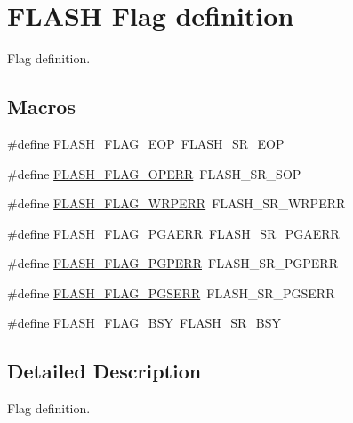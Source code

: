 \hypertarget{group___f_l_a_s_h___flag__definition}{}\section{F\+L\+A\+SH Flag definition}
\label{group___f_l_a_s_h___flag__definition}


Flag definition.  


\subsection*{Macros}
\begin{DoxyCompactItemize}
\item 
\#define \hyperlink{group___f_l_a_s_h___flag__definition_gaf043ba4d8f837350bfc7754a99fae5a9}{F\+L\+A\+S\+H\+\_\+\+F\+L\+A\+G\+\_\+\+E\+OP}~F\+L\+A\+S\+H\+\_\+\+S\+R\+\_\+\+E\+OP
\item 
\#define \hyperlink{group___f_l_a_s_h___flag__definition_gad8a96ceda91fcf0d1299da933b5816f1}{F\+L\+A\+S\+H\+\_\+\+F\+L\+A\+G\+\_\+\+O\+P\+E\+RR}~F\+L\+A\+S\+H\+\_\+\+S\+R\+\_\+\+S\+OP
\item 
\#define \hyperlink{group___f_l_a_s_h___flag__definition_ga6abf64f916992585899369166db3f266}{F\+L\+A\+S\+H\+\_\+\+F\+L\+A\+G\+\_\+\+W\+R\+P\+E\+RR}~F\+L\+A\+S\+H\+\_\+\+S\+R\+\_\+\+W\+R\+P\+E\+RR
\item 
\#define \hyperlink{group___f_l_a_s_h___flag__definition_ga2c3f4dbea065f8ea2987eada4dab30bd}{F\+L\+A\+S\+H\+\_\+\+F\+L\+A\+G\+\_\+\+P\+G\+A\+E\+RR}~F\+L\+A\+S\+H\+\_\+\+S\+R\+\_\+\+P\+G\+A\+E\+RR
\item 
\#define \hyperlink{group___f_l_a_s_h___flag__definition_ga88a93907641f5eeb4091a26b84c94897}{F\+L\+A\+S\+H\+\_\+\+F\+L\+A\+G\+\_\+\+P\+G\+P\+E\+RR}~F\+L\+A\+S\+H\+\_\+\+S\+R\+\_\+\+P\+G\+P\+E\+RR
\item 
\#define \hyperlink{group___f_l_a_s_h___flag__definition_ga25b80c716320e667162846da8be09b68}{F\+L\+A\+S\+H\+\_\+\+F\+L\+A\+G\+\_\+\+P\+G\+S\+E\+RR}~F\+L\+A\+S\+H\+\_\+\+S\+R\+\_\+\+P\+G\+S\+E\+RR
\item 
\#define \hyperlink{group___f_l_a_s_h___flag__definition_gad3bc368f954ad7744deda3315da2fff7}{F\+L\+A\+S\+H\+\_\+\+F\+L\+A\+G\+\_\+\+B\+SY}~F\+L\+A\+S\+H\+\_\+\+S\+R\+\_\+\+B\+SY
\end{DoxyCompactItemize}


\subsection{Detailed Description}
Flag definition. 




